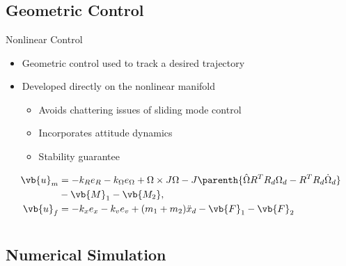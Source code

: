 \documentclass[11pt,professionalfonts]{beamer}
\begin{document}
\section*{}
\subsection*{Geometric Control}
\begin{frame}{Nonlinear Control}
    \begin{itemize}
        \item Geometric control used to track a desired trajectory
        \item Developed directly on the nonlinear manifold
            \begin{itemize}
                \item Avoids chattering issues of sliding mode control
                \item Incorporates attitude dynamics
                \item Stability guarantee
            \end{itemize}
    \end{itemize}

\pause
\begin{align*}
    \vb{u}_m &= - k_R e_R - k_\Omega e_\Omega + \Omega \times J \Omega - J \parenth{\hat{\Omega} R^T R_d \Omega_d - R^T R_d \dot{\Omega}_d}  \\
             &- \vb{M}_1 - \vb{M_2} , \\
    \vb{u}_f &= - k_x e_x  - k_v e_v + ( m_1  + m_2 ) \ddot{x}_d - \vb{F}_1 - \vb{F}_2 
\end{align*}
\end{frame}



\section*{}
\subsection*{Numerical Simulation}
\end{document}
